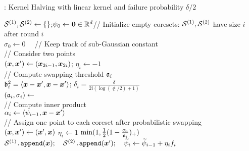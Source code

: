 \begin{algorithm2e}[ht!]

    
    \caption{\khlind: Kernel Halving with linear kernel and failure probability $\delta/2$}
    \label{algo:khlin}
    \small{
      \BlankLine
      {$\coreset[1], \coreset[2] \gets \braces{}$};\quad $\psi_0\gets \boldzero \in \mathbb{R}^d $\quad // Initialize empty coresets: $\coreset[1],\coreset[2]$ have size $i$ after round $i$ \\ 
      $\sigma_0 \gets 0 $  
      \qquad\qquad\qquad\qquad\qquad\quad\ \  // Keep track of sub-Gaussian constant \\
        {%
        // Consider two points \\
        $(\x, \x') \gets (\x_{2i-1}, \x_{2i})$;
        \quad $\eta_i \gets -1$ \\
         \BlankLine
         // Compute swapping threshold $\thresh_i$ \\ %
          $\multiplier_i^2 = \angles{ \x - \x' , \x - \x' }   $; \quad $\delta_i = \frac{\delta}{2i (\log (\nin/2 ) + 1)}$ \\  
          $(\thresh_i, \sigma_i ) \gets$ \\  
       \BlankLine
        // Compute inner product \\
        $\alpha_i\gets \angles{\psi_{i-1}, \x - \x' }  $ \\
        \BlankLine
                 // Assign one point to each coreset after probabilistic swapping \\[2pt]
                 $(\x, \x') \gets (\x', \x)$  $\eta_i \gets 1$  $\min(1, \half (1-\frac{\alpha_i}{\thresh_i})_+)$ \\ 
               $\coreset[1]\texttt{.append}(\x); 
                    \ \ \  \coreset[2]\texttt{.append}(\x'); \ \ \ 
                 \wtpsi_i\gets \wtpsi_{i-1} + \eta_i f_i $ 
      }
      } 

      \hrulefill\\

     \KwRet{$(\cnew[], \sigma)$}\;
  

    \end{algorithm2e}

